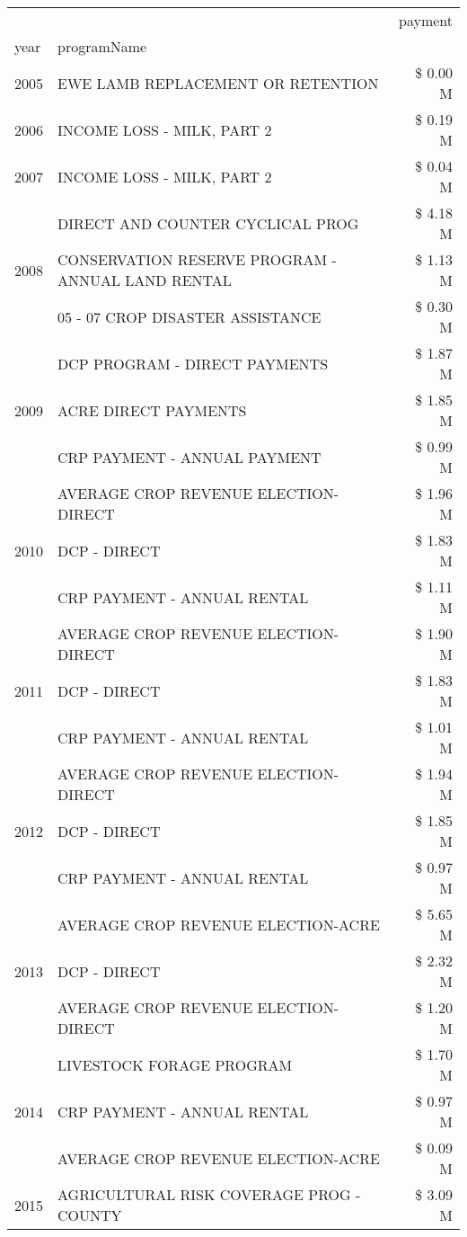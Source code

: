 \begin{tabular}{llr}
\toprule
 &  & payment \\
year & programName &  \\
\midrule
2005 & EWE LAMB REPLACEMENT OR RETENTION & \$ 0.00 M \\
\cline{1-3}
2006 & INCOME LOSS - MILK, PART 2 & \$ 0.19 M \\
\cline{1-3}
2007 & INCOME LOSS - MILK, PART 2 & \$ 0.04 M \\
\cline{1-3}
\multirow[t]{3}{*}{2008} & DIRECT AND COUNTER CYCLICAL PROG & \$ 4.18 M \\
 & CONSERVATION RESERVE PROGRAM - ANNUAL LAND RENTAL & \$ 1.13 M \\
 & 05 - 07 CROP DISASTER ASSISTANCE & \$ 0.30 M \\
\cline{1-3}
\multirow[t]{3}{*}{2009} & DCP PROGRAM - DIRECT PAYMENTS & \$ 1.87 M \\
 & ACRE DIRECT PAYMENTS & \$ 1.85 M \\
 & CRP PAYMENT - ANNUAL PAYMENT & \$ 0.99 M \\
\cline{1-3}
\multirow[t]{3}{*}{2010} & AVERAGE CROP REVENUE ELECTION-DIRECT & \$ 1.96 M \\
 & DCP - DIRECT & \$ 1.83 M \\
 & CRP PAYMENT - ANNUAL RENTAL & \$ 1.11 M \\
\cline{1-3}
\multirow[t]{3}{*}{2011} & AVERAGE CROP REVENUE ELECTION-DIRECT & \$ 1.90 M \\
 & DCP - DIRECT & \$ 1.83 M \\
 & CRP PAYMENT - ANNUAL RENTAL & \$ 1.01 M \\
\cline{1-3}
\multirow[t]{3}{*}{2012} & AVERAGE CROP REVENUE ELECTION-DIRECT & \$ 1.94 M \\
 & DCP - DIRECT & \$ 1.85 M \\
 & CRP PAYMENT - ANNUAL RENTAL & \$ 0.97 M \\
\cline{1-3}
\multirow[t]{3}{*}{2013} & AVERAGE CROP REVENUE ELECTION-ACRE & \$ 5.65 M \\
 & DCP - DIRECT & \$ 2.32 M \\
 & AVERAGE CROP REVENUE ELECTION-DIRECT & \$ 1.20 M \\
\cline{1-3}
\multirow[t]{3}{*}{2014} & LIVESTOCK FORAGE PROGRAM & \$ 1.70 M \\
 & CRP PAYMENT - ANNUAL RENTAL & \$ 0.97 M \\
 & AVERAGE CROP REVENUE ELECTION-ACRE & \$ 0.09 M \\
\cline{1-3}
\multirow[t]{3}{*}{2015} & AGRICULTURAL RISK COVERAGE PROG - COUNTY & \$ 3.09 M \\

\end{tabular}
